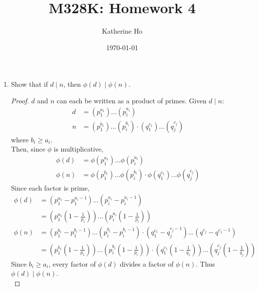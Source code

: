 \documentclass[11pt]{article}
\title{M328K: Homework 4}
\author{Katherine Ho}
\date\today
\theoremstyle{definition}
\begin{document}
\maketitle

\begin{enumerate}
    \item Show that if $d\mid n$, then $\phi(d)\mid \phi(n)$.
    \begin{proof}
        $d$ and $n$ can each be written as a product of primes. Given $d\mid n$:
        \begin{align*}
            d &= (p_1^{a_1})\dots(p_i^{a_i}) \\
            n &= (p_1^{b_1})\dots(p_i^{b_i})\cdot (q_1^{c_1})\dots(q_j^{c_j})
        \end{align*}
        where $b_i\ge a_i$. \\
        Then, since $\phi$ is multiplicative,
        \begin{align*}
            \phi(d) &= \phi(p_1^{a_1})\dots\phi(p_i^{a_i}) \\
            \phi(n) &= \phi(p_1^{b_1})\dots\phi(p_i^{b_i})\cdot \phi(q_1^{c_1})\dots\phi(q_j^{c_j})
        \end{align*}
        Since each factor is prime,
        \begin{align*}
            \phi(d) &= (p_1^{a_1} - p_1^{a_i-1})\dots(p_i^{a_i} - p_i^{a_i-1}) \\
            &= (p_1^{a_1}(1-\frac{1}{p_1}))\dots(p_i^{a_i}(1-\frac{1}{p_i})) \\
            \phi(n) &= (p_1^{b_1} - p_1^{b_i-1})\dots(p_i^{b_i} - p_i^{b_i-1})\cdot(q_1^{c_1} - q_j^{c_j-1})\dots(q^{c_j} - q^{c_j-1}) \\
            &= (p_1^{b_1}(1-\frac{1}{p_1}))\dots(p_i^{b_i}(1-\frac{1}{p_i}))\cdot(q_1^{c_1}(1-\frac{1}{q_1}))\dots(q_j^{c_j}(1-\frac{1}{q_j}))
        \end{align*}
        Since $b_i\ge a_i$, every factor of $\phi(d)$ divides a factor of $\phi(n)$.
        Thus $\phi(d)\mid \phi(n)$. \\
    \end{proof}


\end{enumerate}
\end{document}
